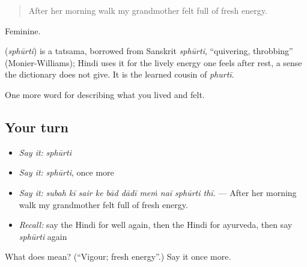 \begin{quote}
After her morning walk my grandmother felt full of fresh energy.
\end{quote}

Feminine.

\begin{cousinweb}
\textbf{} (\emph{sphūrti}) is a tatsama, borrowed from Sanskrit \emph{sphūrti}, \textquotedblleft{}quivering, throbbing\textquotedblright{} (Monier-Williams); Hindi uses it for the lively energy one feels after rest, a sense the dictionary does not give. It is the learned cousin of \emph{phurtī}.
\end{cousinweb}

\begin{grammarlens}[title={What you've built}]
One more word for describing what you lived and felt.
\end{grammarlens}

\subsection*{Your turn}
\begin{itemize}
\raggedright
  \item \emph{Say it:} \emph{sphūrti}
  \item \emph{Say it:} \emph{sphūrti}, once more
  \item \emph{Say it:} \emph{subah kī sair ke bād dādī meṁ naī sphūrti thī.} — After her morning walk my grandmother felt full of fresh energy.
  \item \emph{Recall:} say the Hindi for well again, then the Hindi for ayurveda, then say \emph{sphūrti} again
\end{itemize}

\begin{tcolorbox}[breakable,colback=teal!4,colframe=teal!35!black,title={Before you move on}]
What does  mean? (\textquotedblleft{}Vigour; fresh energy\textquotedblright{}.) Say it once more.
\end{tcolorbox}
